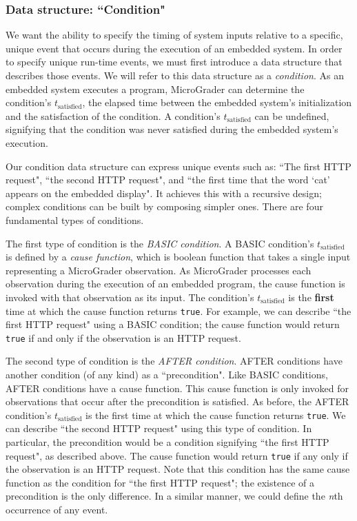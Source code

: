 \documentclass[12pt]{article}
\begin{document}
\subsubsection{Data structure: ``Condition"}
\label{sec:condition}
We want the ability to specify the timing of system inputs relative to a specific, unique event that occurs during the execution of an embedded system.  In order to specify unique run-time events, we must first introduce a data structure that describes those events.  We will refer to this data structure as a \textit{condition}.  As an embedded system executes a program, MicroGrader can determine the condition's $t_{\text{satisfied}}$, the elapsed time between the embedded system's initialization and the satisfaction of the condition.  A condition's $t_{\text{satisfied}}$ can be undefined, signifying that the condition was never satisfied during the embedded system's execution.

Our condition data structure can express unique events such as: ``The first HTTP request", ``the second HTTP request", and ``the first time that the word `cat' appears on the embedded display".  It achieves this with a recursive design; complex conditions can be built by composing simpler ones.  There are four fundamental types of conditions.

The first type of condition is the \textit{BASIC condition}.  A BASIC condition's $t_{\text{satisfied}}$ is defined by a \textit{cause function}, which is boolean function that takes a single input representing a MicroGrader observation.  As MicroGrader processes each observation during the execution of an embedded program, the cause function is invoked with that observation as its input.  The condition's $t_{\text{satisfied}}$ is the \textbf{first} time at which the cause function returns \texttt{true}.  For example, we can describe ``the first HTTP request" using a BASIC condition; the cause function would return \texttt{true} if and only if the observation is an HTTP request.

The second type of condition is the \textit{AFTER condition}.  AFTER conditions have another condition (of any kind) as a ``precondition".  Like BASIC conditions, AFTER conditions have a cause function.  This cause function is only invoked for observations that occur after the precondition is satisfied.  As before, the AFTER condition's $t_{\text{satisfied}}$ is the first time at which the cause function returns \texttt{true}.  We can describe ``the second HTTP request" using this type of condition.  In particular, the precondition would be a condition signifying ``the first HTTP request", as described above.  The cause function would return \texttt{true} if any only if the observation is an HTTP request.  Note that this condition has the same cause function as the condition for ``the first HTTP request"; the existence of a precondition is the only difference.  In a similar manner, we could define the \textit{n}th occurrence of any event.
\end{document}

